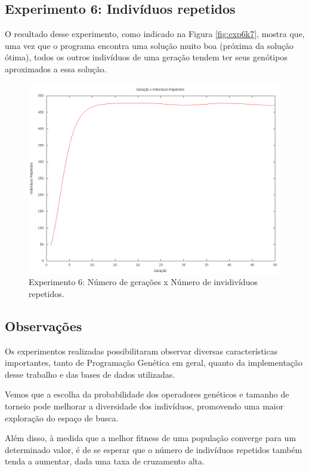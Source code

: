 \documentclass[12pt]{article}
\begin{document}
\subsection{Experimento 6: Indivíduos repetidos}

O resultado desse experimento, como indicado na Figura \ref{fig:exp6k7}, mostra que, uma vez que o
programa encontra uma solução muito boa (próxima da solução ótima), todos os outros indivíduos de
uma geração tendem ter seus genótipos aproximados a essa solução.

\begin{figure}[ht]
  \centering
  \includegraphics[width=1\textwidth]{exp6k7.png}
  \caption{Experimento 6: Número de gerações x Número de invidivíduos repetidos.}
  \label{fig:expk7}
\end{figure}

\subsection{Observações}

Os experimentos realizadas possibilitaram observar diversas características importantes, tanto
de Programação Genética em geral, quanto da implementação desse trabalho e das bases de dados
utilizadas.

Vemos que a escolha da probabilidade dos operadores genéticos e tamanho de torneio pode melhorar
a diversidade dos indivíduos, promovendo uma maior exploração do espaço de busca.

Além disso, à medida que a melhor fitness de uma população converge para um determinado valor,
é de se esperar que o número de indivíduos repetidos também tenda a aumentar, dada uma taxa 
de cruzamento alta.
\end{document}
